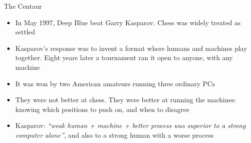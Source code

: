 \documentclass[aspectratio=169]{beamer}
\begin{document}
\begin{frame}{The Centaur}
    \begin{itemize}\setlength{\itemsep}{6pt}
        \item In May 1997, Deep Blue beat Garry Kasparov. Chess was widely treated as settled
        \item Kasparov's response was to invent a format where humans and machines play
              together. Eight years later a tournament ran it open to anyone, with any machine
        \item It was won by two American amateurs running three ordinary PCs
        \item They were not better at chess. They were better at running the machines:
              knowing which positions to push on, and when to disagree
        \item Kasparov: \textit{``weak human + machine + better process was superior to a
              strong computer alone''}, and also to a strong human with a worse process
    \end{itemize}
\end{frame}
\end{document}
